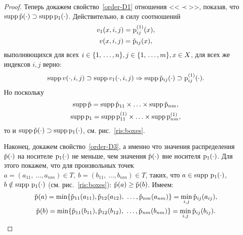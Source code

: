\begin{proof}
Теперь докажем свойство~\ref{order-D1} отношения <<$\prec$>>, показав, что ${\mathrm{supp}}\,\check{{\mathrm{p}}}(\cdot) \supset {\mathrm{supp}}\, {\mathrm{p}}_1(\cdot)$. Действительно, в силу соотношений 
\begin{gather}
  \label{vrdef} v_1(x, i,j) =	 {{\mathrm{p}}}_{ij}^{(1)}(x), \\
  \label {vdef} v(x, i,j) = 	\check{{\mathrm{p}}}_{ij}(x), 
\end{gather}
выполняющихся для всех $i \in \{1,\, \ldots, n\},j \in \{1,\, \ldots, m\},x \in X$, для всех же индексов $i,j$ верно:  
\begin{equation*}
\label{vsuppset}
    {\mathrm{supp}}\,v(\cdot, i, j) \supset {\mathrm{supp}}\,v_1(\cdot, i, j) \Rightarrow  {\mathrm{supp}}\,\check{{\mathrm{p}}}_{ij}(\cdot) \supset {{\mathrm{p}}}_{ij}^{(1)}(\cdot).
\end{equation*}
Но поскольку 
\begin{gather}
  \label{supp_cross_CP} {\mathrm{supp}}\,\check{{\mathrm{p}}} =  {\mathrm{supp}}\,\check{{\mathrm{p}}}_{11}  \times \ldots \times {\mathrm{supp}}\,\check{{\mathrm{p}}}_{nm}, 
  \\ \label{supp_cross_P1} {\mathrm{supp}}\, {\mathrm{p}}_1 =  {\mathrm{supp}}\,{{\mathrm{p}}}^{(1)}_{11}  \times \ldots \times {\mathrm{supp}}\,{{\mathrm{p}}}^{(1)}_{nm},
\end{gather}
то и ${\mathrm{supp}}\,\check{{\mathrm{p}}}(\cdot) \supset {\mathrm{supp}}\, {\mathrm{p}}_1(\cdot)$, см. рис.~\ref{ris:boxes}.

Наконец, докажем свойство~\ref{order-D3}, а именно что значения распределения $\check{{\mathrm{p}}}(\cdot)$ на носителе ${\mathrm{p}}_1(\cdot)$ не меньше, чем значения $\check{{\mathrm{p}}}(\cdot)$ вне носителя ${\mathrm{p}}_1(\cdot)$. Для этого покажем, что для произвольных точек $a = (a_{11},\ \ldots, a_{nm}) \in T,\  b = (b_{11},\ \ldots, b_{nm}) \in T$, таких, что $a \in {\mathrm{supp}}\ {\mathrm{p}}_1(\cdot)$, $b \notin {\mathrm{supp}}\ {\mathrm{p}}_1(\cdot)$ (см. рис.~\ref{ris:boxes}): $\check{{\mathrm{p}}}(a) \geq \check{{\mathrm{p}}}(b)$. Имеем:
\begin{gather}
\label{checkPA} \check{{\mathrm{p}}}(a) = \min \{\check{{\mathrm{p}}}_{11}(a_{11}), \check{{\mathrm{p}}}_{12}(a_{12}),\ \ldots, \check{{\mathrm{p}}}_{nm}(a_{nm})\} =  \min_{i,j} \check{{\mathrm{p}}}_{ij}(a_{ij}),
\\ \label{checkPB}  \check{{\mathrm{p}}}(b) = \min \{\check{{\mathrm{p}}}_{11}(b_{11}), \check{{\mathrm{p}}}_{12}(b_{12}),\ \ldots, \check{{\mathrm{p}}}_{nm}(b_{nm})\} =  \min_{i,j} \check{{\mathrm{p}}}_{ij}(b_{ij}).
\end{gather}


\end{proof}
